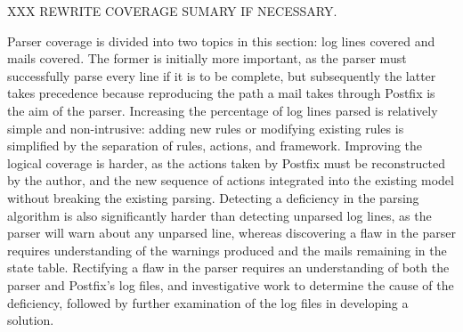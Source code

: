 XXX REWRITE COVERAGE SUMARY IF NECESSARY\@.

Parser coverage is divided into two topics in this section: log lines
covered and mails covered.  The former is initially more important, as the
parser must successfully parse every line if it is to be complete, but
subsequently the latter takes precedence because reproducing the path a
mail takes through Postfix is the aim of the parser.  Increasing the
percentage of log lines parsed is relatively simple and non-intrusive:
adding new rules or modifying existing rules is simplified by the
separation of rules, actions, and framework.  Improving the logical coverage
is harder, as the actions taken by Postfix must be reconstructed by the
author, and the new sequence of actions integrated into the existing model
without breaking the existing parsing.  Detecting a deficiency in the
parsing algorithm is also significantly harder than detecting unparsed log
lines, as the parser will warn about any unparsed line, whereas discovering
a flaw in the parser requires understanding of the warnings produced and
the mails remaining in the state table.  Rectifying a flaw in the parser
requires an understanding of both the parser and Postfix's log files, and
investigative work to determine the cause of the deficiency, followed by
further examination of the log files in developing a solution.

